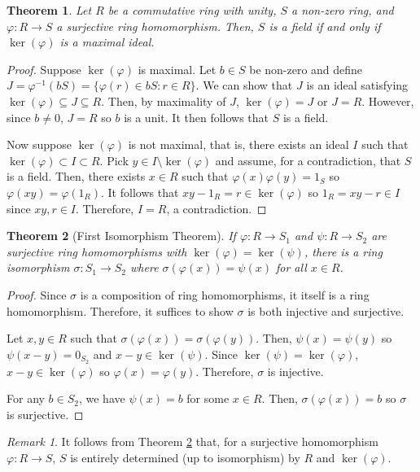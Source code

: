 \documentclass[parskip=half]{scrartcl}  %
\theoremstyle{definition}
\theoremstyle{plain}
\newtheorem{theorem}{Theorem}[definition]
\theoremstyle{remark}
\newtheorem{remark}{Remark}[definition]
\begin{document}
\begin{theorem}
    Let $R$ be a commutative ring with unity, $S$ a non-zero ring, and $\varphi:R\to S$ a
    surjective ring homomorphism.
    Then, $S$ is a field if and only if $\ker(\varphi)$ is a maximal ideal.
\end{theorem}

\begin{proof}
    Suppose $\ker(\varphi)$ is maximal.
    Let $b\in S$ be non-zero and define $J=\varphi^{-1}(bS)=\{\varphi(r)\in bS:r\in R\}$.
    We can show that $J$ is an ideal satisfying $\ker(\varphi)\subseteq J\subseteq R$.
    Then, by maximality of $J$, $\ker(\varphi)=J$ or $J=R$.
    However, since $b\neq 0$, $J=R$ so $b$ is a unit.
    It then follows that $S$ is a field.

    Now suppose $\ker(\varphi)$ is not maximal, that is, there exists an ideal $I$ such that
    $\ker(\varphi)\subset I\subset R$.
    Pick $y\in I\setminus\ker(\varphi)$ and assume, for a contradiction, that $S$ is a field.
    Then, there exists $x\in R$ such that $\varphi(x)\varphi(y)=1_S$ so $\varphi(xy)=\varphi(1_R)$.
    It follows that $xy-1_R=r\in\ker(\varphi)$ so $1_R=xy-r\in I$ since $xy,r\in I$.
    Therefore, $I=R$, a contradiction.
\end{proof}

\begin{theorem}[First Isomorphism Theorem]
    \label{thm:isomorphism}
    If $\varphi:R\to S_1$ and $\psi:R\to S_2$ are surjective ring homomorphisms with
    $\ker(\varphi)=\ker(\psi)$, there is a ring isomorphism $\sigma:S_1\to S_2$ where
    $\sigma(\varphi(x))=\psi(x)$ for all $x\in R$.
\end{theorem}

\begin{proof}
    Since $\sigma$ is a composition of ring homomorphisms, it itself is a ring homomorphism.
    Therefore, it suffices to show $\sigma$ is both injective and surjective.

    Let $x,y\in R$ such that $\sigma(\varphi(x))=\sigma(\varphi(y))$.
    Then, $\psi(x)=\psi(y)$ so $\psi(x-y)=0_{S_2}$ and $x-y\in\ker(\psi)$.
    Since $\ker(\psi)=\ker(\varphi)$, $x-y\in\ker(\varphi)$ so $\varphi(x)=\varphi(y)$.
    Therefore, $\sigma$ is injective.

    For any $b\in S_2$, we have $\psi(x)=b$ for some $x\in R$.
    Then, $\sigma(\varphi(x))=b$ so $\sigma$ is surjective.
\end{proof}

\begin{remark}
    It follows from Theorem \ref{thm:isomorphism} that, for a surjective homomorphism
    $\varphi:R\to S$, $S$ is entirely determined (up to isomorphism) by $R$ and $\ker(\varphi)$.
\end{remark}
\end{document}
